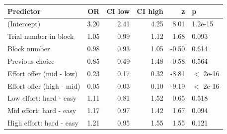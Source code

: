 \begin{table}[ht]
\centering
\begin{tabular}{lrrrrl}
  \hline
Predictor & OR & CI low & CI high & z & p \\ 
  \hline
(Intercept) & 3.20 & 2.41 & 4.25 & 8.01 & 1.2e-15 \\ 
  Trial number in block & 1.05 & 0.99 & 1.12 & 1.68 & 0.093 \\ 
  Block number & 0.98 & 0.93 & 1.05 & -0.50 & 0.614 \\ 
  Previous choice & 0.85 & 0.49 & 1.48 & -0.58 & 0.564 \\ 
  Effort offer (mid - low) & 0.23 & 0.17 & 0.32 & -8.81 & $<$ 2e-16 \\ 
  Effort offer (high - mid) & 0.05 & 0.03 & 0.10 & -9.19 & $<$ 2e-16 \\ 
  Low effort: hard - easy & 1.11 & 0.81 & 1.52 & 0.65 & 0.518 \\ 
  Mid effort: hard - easy & 1.17 & 0.97 & 1.42 & 1.67 & 0.094 \\ 
  High effort: hard - easy & 1.21 & 0.95 & 1.55 & 1.55 & 0.121 \\ 
   \hline
\end{tabular}
\end{table}

